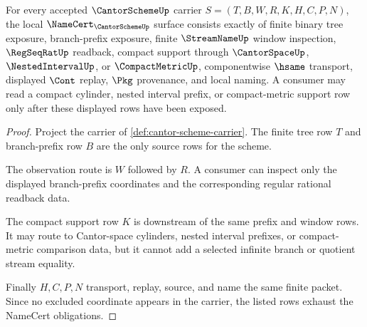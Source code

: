 \begin{theorem}
\label{thm:cantor-scheme-namecert-obligations}
For every accepted $\CantorSchemeUp$ carrier $S=(T,B,W,R,K,H,C,P,N)$, the local $\NameCert_{\CantorSchemeUp}$ surface consists exactly of finite binary tree exposure, branch-prefix exposure, finite $\StreamNameUp$ window inspection, $\RegSeqRatUp$ readback, compact support through $\CantorSpaceUp$, $\NestedIntervalUp$, or $\CompactMetricUp$, componentwise $\hsame$ transport, displayed $\Cont$ replay, $\Pkg$ provenance, and local naming. A consumer may read a compact cylinder, nested interval prefix, or compact-metric support row only after these displayed rows have been exposed.
\end{theorem}
\begin{proof}
Project the carrier of \autoref{def:cantor-scheme-carrier}. The finite tree row $T$ and branch-prefix row $B$ are the only source rows for the scheme.

The observation route is $W$ followed by $R$. A consumer can inspect only the displayed branch-prefix coordinates and the corresponding regular rational readback data.

The compact support row $K$ is downstream of the same prefix and window rows. It may route to Cantor-space cylinders, nested interval prefixes, or compact-metric comparison data, but it cannot add a selected infinite branch or quotient stream equality.

Finally $H,C,P,N$ transport, replay, source, and name the same finite packet. Since no excluded coordinate appears in the carrier, the listed rows exhaust the NameCert obligations.
\end{proof}

